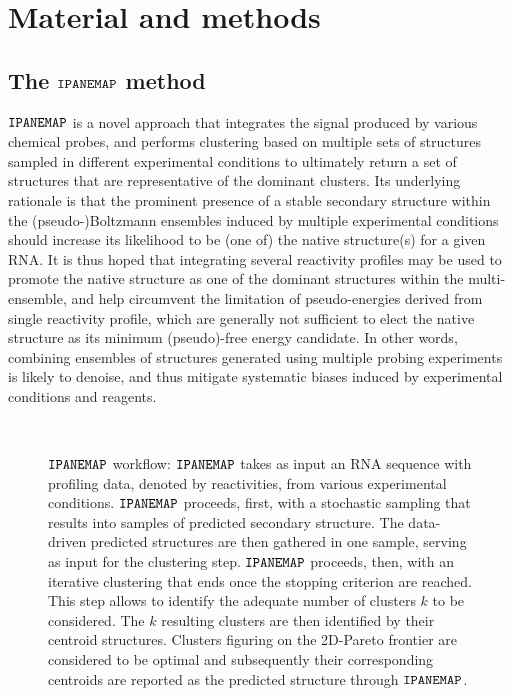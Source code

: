 \documentclass[a4,center,fleqn]{NAR}
\newcommand{\Software}[1]{$\text{\ttfamily #1}$}
\newcommand{\OurTool}{\Software{IPANEMAP}\xspace}
\begin{document}
\section{Material and methods}

\subsection{The \OurTool{} method}

\OurTool{} is a novel approach that integrates the signal produced by various chemical probes, and performs clustering based on multiple sets of structures sampled in different experimental conditions to ultimately return a set of structures that are representative of the dominant clusters. Its underlying rationale is that the prominent presence of a stable secondary structure within the  (pseudo-)Boltzmann ensembles induced by multiple experimental conditions should increase its likelihood to be (one of) the native structure(s) for a given RNA. It is thus hoped that integrating several reactivity profiles may be used to promote the native structure as one of the dominant structures within the multi-ensemble, and help circumvent the limitation of pseudo-energies derived from single reactivity profile, which are generally not sufficient to elect the native structure as its minimum (pseudo)-free energy candidate. In other words, combining ensembles of structures generated using multiple probing experiments is likely to denoise, and thus mitigate systematic biases induced by experimental conditions and reagents.

\begin{figure}
	{\centering\resizebox{.9\columnwidth}{!}{
			
		}\\}
	
	\caption{\OurTool{} workflow: \OurTool{} takes as input an RNA sequence with profiling data, denoted by reactivities, from various experimental conditions. \OurTool{} proceeds, first,  with a stochastic sampling that results into samples of predicted secondary structure. The data-driven predicted structures are then gathered in one sample, serving as input for the clustering step. \OurTool{} proceeds, then, with an iterative clustering that ends once the stopping criterion are reached. This step allows to identify the adequate number of clusters $k$ to be considered. The $k$ resulting clusters are then identified by their centroid structures. Clusters figuring on the 2D-Pareto frontier are considered to be optimal and subsequently their corresponding centroids are reported as the predicted structure through \OurTool.}\label{fig:approach}
\end{figure}
\end{document}
